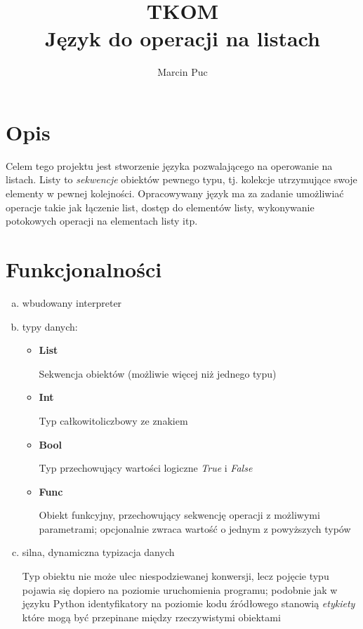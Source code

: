\documentclass{article}
\title{TKOM\\
	Język do operacji na listach}
\author{Marcin Puc}
\date{}
\begin{document}
\maketitle

\section{Opis}
	Celem tego projektu jest stworzenie języka pozwalającego na operowanie na listach. Listy to \textit{sekwencje} obiektów pewnego typu, tj. kolekcje utrzymujące swoje elementy w pewnej kolejności.
	Opracowywany język ma za zadanie umożliwiać operacje takie jak łączenie list, dostęp do elementów listy, wykonywanie potokowych operacji na elementach listy itp.

\section{Funkcjonalności}
	\begin{enumerate}[a)]
		\item wbudowany interpreter
		\item typy danych:
			\begin{itemize}
				\item{\textbf{List}}

					Sekwencja obiektów (możliwie więcej niż jednego typu)
				\item{\textbf{Int}}

					Typ całkowitoliczbowy ze znakiem
				\item{\textbf{Bool}}

					Typ przechowujący wartości logiczne
					\textit{True} i \textit{False}
				\item{\textbf{Func}}

					Obiekt funkcyjny, przechowujący sekwencję operacji
					z możliwymi parametrami;
					opcjonalnie zwraca wartość o jednym z powyższych typów
			\end{itemize}
		\item silna, dynamiczna typizacja danych

			Typ obiektu nie może ulec niespodziewanej konwersji,
			lecz pojęcie typu pojawia się dopiero na poziomie
			uruchomienia programu;
			podobnie jak w języku Python identyfikatory na poziomie kodu źródłowego
			stanowią \textit{etykiety} które mogą być przepinane między
			rzeczywistymi obiektami
	\end{enumerate}
	
\end{document}
